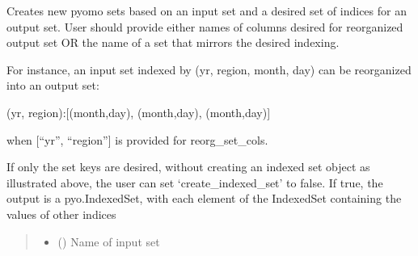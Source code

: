 \documentclass[letterpaper,10pt,english]{sphinxmanual}
\begin{document}
\begin{fulllineitems}
\begin{fulllineitems}
\label{\detokenize{src.common.model:src.common.model.Model.reorganize_index_set}}
\pysigstartsignatures
\pysiglinewithargsret
{}
{\sphinxparamcomma {}\sphinxparamcomma {}\sphinxparamcomma {}\sphinxparamcomma {}\sphinxparamcomma {}}
{}
\pysigstopsignatures
\sphinxAtStartPar
Creates new pyomo sets based on an input set and a desired set of indices for an output
set. User should provide either names of columns desired for reorganized output set OR the
name of a set that mirrors the desired indexing.

\sphinxAtStartPar
For instance, an input set indexed by (yr, region, month, day) can be reorganized into an
output set:

\sphinxAtStartPar
(yr, region):{[}(month,day), (month,day), (month,day){]}

\sphinxAtStartPar
when {[}“yr”, “region”{]} is provided for reorg\_set\_cols.

\sphinxAtStartPar
If only the set keys are desired, without creating an indexed set object as illustrated
above, the user can set ‘create\_indexed\_set’ to false. If true, the output is a
pyo.IndexedSet, with each element of the IndexedSet containing the values of other indices
\begin{quote}\begin{description}
\begin{itemize}
\item {} 
\sphinxAtStartPar
{} () \textendash{} Name of input set


\end{itemize}
\end{description}
\end{quote}
\end{fulllineitems}
\end{fulllineitems}
\end{document}
